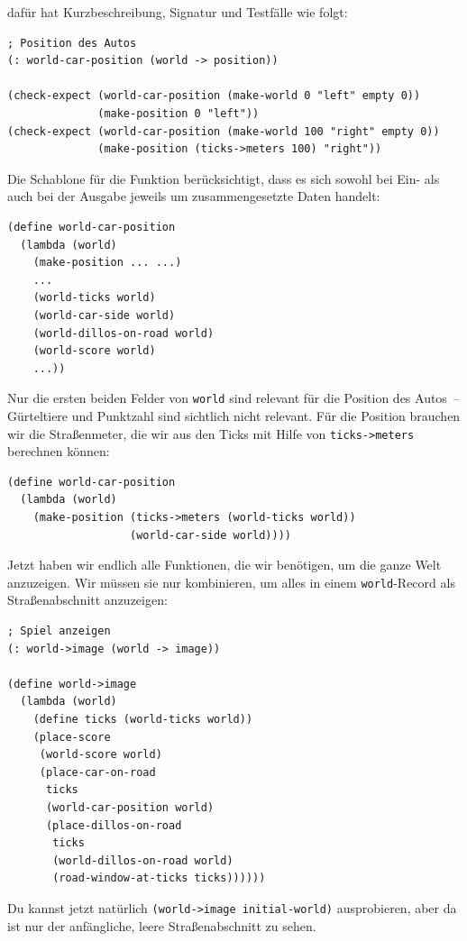 dafür hat Kurzbeschreibung, Signatur und Testfälle wie folgt:
%
\begin{lstlisting}
; Position des Autos
(: world-car-position (world -> position))

(check-expect (world-car-position (make-world 0 "left" empty 0))
              (make-position 0 "left"))
(check-expect (world-car-position (make-world 100 "right" empty 0))
              (make-position (ticks->meters 100) "right"))
\end{lstlisting}
%
Die Schablone für die Funktion berücksichtigt, dass es sich sowohl bei
Ein- als auch bei der Ausgabe jeweils um zusammengesetzte Daten handelt:
%
\begin{lstlisting}
(define world-car-position
  (lambda (world)
    (make-position ... ...)
    ...
    (world-ticks world)
    (world-car-side world)
    (world-dillos-on-road world)
    (world-score world)
    ...))
\end{lstlisting}
%
Nur die ersten beiden Felder von \lstinline{world} sind relevant für
die Position des Autos~-- Gürteltiere und Punktzahl sind sichtlich
nicht relevant.  Für die Position brauchen wir die Straßenmeter, die
wir aus den Ticks mit Hilfe von \lstinline{ticks->meters} berechnen
können:
%
\begin{lstlisting}
(define world-car-position
  (lambda (world)
    (make-position (ticks->meters (world-ticks world))
                   (world-car-side world))))
\end{lstlisting}
%
Jetzt haben wir endlich alle Funktionen, die wir benötigen, um die
ganze Welt anzuzeigen.  Wir müssen sie nur kombinieren, um alles in
einem \lstinline{world}-Record als Straßenabschnitt anzuzeigen:
%
\begin{lstlisting}
; Spiel anzeigen
(: world->image (world -> image))

(define world->image
  (lambda (world)
    (define ticks (world-ticks world))
    (place-score
     (world-score world)
     (place-car-on-road
      ticks
      (world-car-position world)
      (place-dillos-on-road
       ticks
       (world-dillos-on-road world)
       (road-window-at-ticks ticks))))))
\end{lstlisting}
%
Du kannst jetzt natürlich
\lstinline{(world->image initial-world)}
ausprobieren, aber da ist nur der anfängliche, leere Straßenabschnitt
zu sehen.

